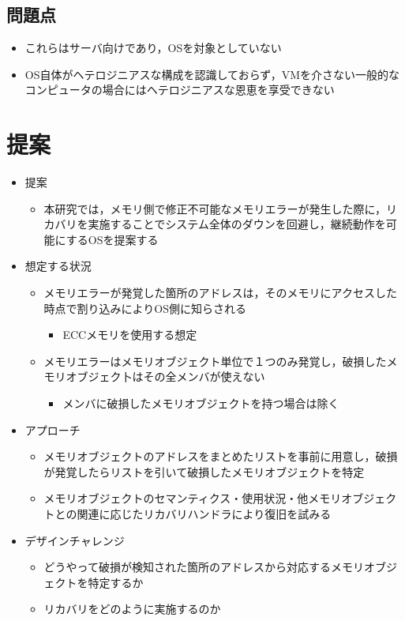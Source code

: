 \documentclass[10.5ptj,a4j]{ltjsarticle}
\providecommand{\tightlist}{%
  \setlength{\itemsep}{0pt}\setlength{\parskip}{0pt}}
\begin{document}
\subsection{問題点}
\begin{itemize}\tightlist{}
  \item これらはサーバ向けであり，OSを対象としていない
  \item OS自体がヘテロジニアスな構成を認識しておらず，VMを介さない一般的なコンピュータの場合にはヘテロジニアスな恩恵を享受できない
\end{itemize}


\section{提案}
\begin{itemize}\tightlist{}
  \item{提案}
  \begin{itemize}\tightlist{}
    \item 本研究では，メモリ側で修正不可能なメモリエラーが発生した際に，リカバリを実施することでシステム全体のダウンを回避し，継続動作を可能にするOSを提案する
  \end{itemize}

  \item{想定する状況}
  \begin{itemize}\tightlist{}
    \item メモリエラーが発覚した箇所のアドレスは，そのメモリにアクセスした時点で割り込みによりOS側に知らされる
    \begin{itemize}\tightlist{}
      \item ECCメモリを使用する想定
    \end{itemize}
    \item メモリエラーはメモリオブジェクト単位で１つのみ発覚し，破損したメモリオブジェク卜はその全メンバが使えない
    \begin{itemize}\tightlist{}
      \item メンバに破損したメモリオブジェクトを持つ場合は除く
    \end{itemize}
  \end{itemize}

  \item{アプローチ}
  \begin{itemize}\tightlist{}
    \item メモリオブジェクトのアドレスをまとめたリストを事前に用意し，破損が発覚したらリストを引いて破損したメモリオブジェクトを特定
    \item メモリオブジェクトのセマンティクス・使用状況・他メモリオブジェクトとの関連に応じたリカバリハンドラにより復旧を試みる
  \end{itemize}

  \item{デザインチャレンジ}
  \begin{itemize}\tightlist{}
    \item どうやって破損が検知された箇所のアドレスから対応するメモリオブジェクトを特定するか
    \item リカバリをどのように実施するのか
  \end{itemize}
\end{itemize}
\end{document}
